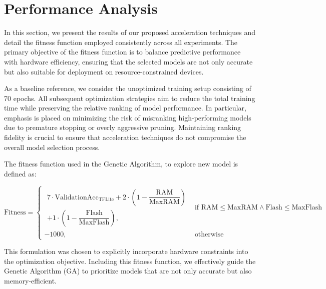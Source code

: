 \chapter{Performance Analysis}
\label{chap:performance_analysis}

In this section, we present the results of our proposed acceleration techniques and detail the fitness function employed consistently across all experiments. The primary objective of the fitness function is to balance predictive performance with hardware efficiency, ensuring that the selected models are not only accurate but also suitable for deployment on resource-constrained devices.

As a baseline reference, we consider the unoptimized training setup consisting of 70 epochs. All subsequent optimization strategies aim to reduce the total training time while preserving the relative ranking of model performance. In particular, emphasis is placed on minimizing the risk of misranking high-performing models due to premature stopping or overly aggressive pruning. Maintaining ranking fidelity is crucial to ensure that acceleration techniques do not compromise the overall model selection process.

The fitness function used in the Genetic Algorithm, to explore new model is defined as:

\sloppy
\begin{equation}
\text{Fitness} =
\begin{cases}
\begin{aligned}
7 \cdot \text{ValidationAcc}_{\text{TFLite}} 
+ 2 \cdot \left(1 - \dfrac{\text{RAM}}{\text{MaxRAM}}\right) \\
+ 1 \cdot \left(1 - \dfrac{\text{Flash}}{\text{MaxFlash}}\right),
\end{aligned}
& \text{if } \text{RAM} \leq \text{MaxRAM} \land \text{Flash} \leq \text{MaxFlash} \\
-1000, & \text{otherwise}
\end{cases}
\label{eq:fitness_function}
\end{equation}



This formulation was chosen to explicitly incorporate hardware constraints into the optimization objective. Including this fitness function, we effectively guide the Genetic Algorithm (GA) to prioritize models that are not only accurate but also memory-efficient.

